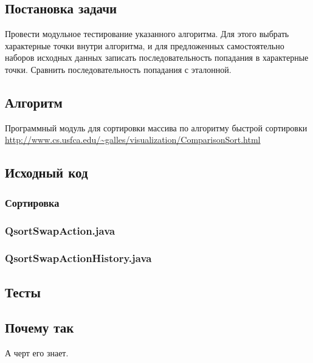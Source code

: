 \subsection{Постановка задачи}
Провести модульное тестирование указанного алгоритма. Для этого выбрать характерные точки внутри алгоритма, и для предложенных самостоятельно наборов исходных данных записать последовательность попадания в характерные точки. Сравнить последовательность попадания с эталонной.
\subsection{Алгоритм}
Программный модуль для сортировки массива по алгоритму быстрой сортировки \url{http://www.cs.usfca.edu/~galles/visualization/ComparisonSort.html}
\subsection{Исходный код}
\subsubsection{Сортировка}

\subsubsection{QsortSwapAction.java}

\subsubsection{QsortSwapActionHistory.java}

\subsection{Тесты}

\subsection{Почему так}
А черт его знает.